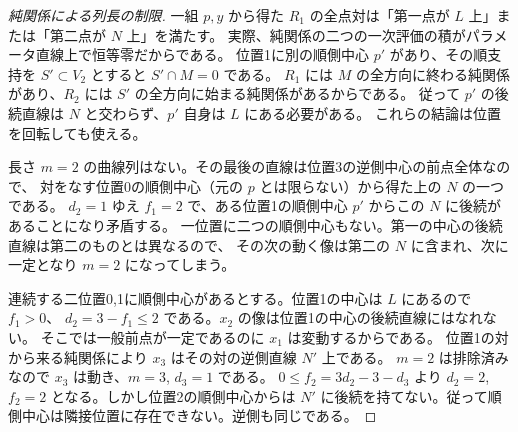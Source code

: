 \begin{proof}[純関係による列長の制限]
一組 $p,y$ から得た $R_1$ の全点対は「第一点が $L$ 上」または「第二点が $N$ 上」を満たす。
実際、純関係の二つの一次評価の積がパラメータ直線上で恒等零だからである。
位置1に別の順側中心 $p'$ があり、その順支持を $S'\subset V_2$ とすると $S'\cap M=0$ である。
$R_1$ には $M$ の全方向に終わる純関係があり、$R_2$ には $S'$ の全方向に始まる純関係があるからである。
従って $p'$ の後続直線は $N$ と交わらず、$p'$ 自身は $L$ にある必要がある。
これらの結論は位置を回転しても使える。

長さ $m=2$ の曲線列はない。その最後の直線は位置3の逆側中心の前点全体なので、
対をなす位置0の順側中心（元の $p$ とは限らない）から得た上の $N$ の一つである。
$d_2=1$ ゆえ $f_1=2$ で、ある位置1の順側中心 $p'$ からこの $N$ に後続があることになり矛盾する。
一位置に二つの順側中心もない。第一の中心の後続直線は第二のものとは異なるので、
その次の動く像は第二の $N$ に含まれ、次に一定となり $m=2$ になってしまう。

連続する二位置0,1に順側中心があるとする。位置1の中心は $L$ にあるので $f_1>0$、
$d_2=3-f_1\le2$ である。$x_2$ の像は位置1の中心の後続直線にはなれない。
そこでは一般前点が一定であるのに $x_1$ は変動するからである。
位置1の対から来る純関係により $x_3$ はその対の逆側直線 $N'$ 上である。
$m=2$ は排除済みなので $x_3$ は動き、$m=3$, $d_3=1$ である。
$0\le f_2=3d_2-3-d_3$ より $d_2=2$, $f_2=2$ となる。しかし位置2の順側中心からは
$N'$ に後続を持てない。従って順側中心は隣接位置に存在できない。逆側も同じである。
\end{proof}

